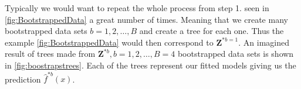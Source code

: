 \begin{table}[htb]
    \caption{This figure shows the process of bootstrapping and building a tree from the bootstrapped data. The latter is done by picking a random subset of features-columns. In this case the subset size was chosen as two}
    \label{fig:BootstrappedData}
\end{table}

Typically we would want to repeat the whole process from step 1. seen in \cref{fig:BootstrappedData} a great number of times. Meaning that we create many bootstrapped data sets $b=1,2, \ldots, B$ and create a tree for each one.
Thus the example \cref{fig:BootstrappedData} would then correspond to $\mathbf{Z}^{* b=1}$. An imagined result of trees made from $\mathbf{Z}^{* b}, b=1,2, \ldots, B=4$ bootstrapped data sets is shown in \cref{fig:boostrapstrees}.
Each of the trees represent our fitted models giving us the prediction $\hat{f}^{* b}(x)$.


